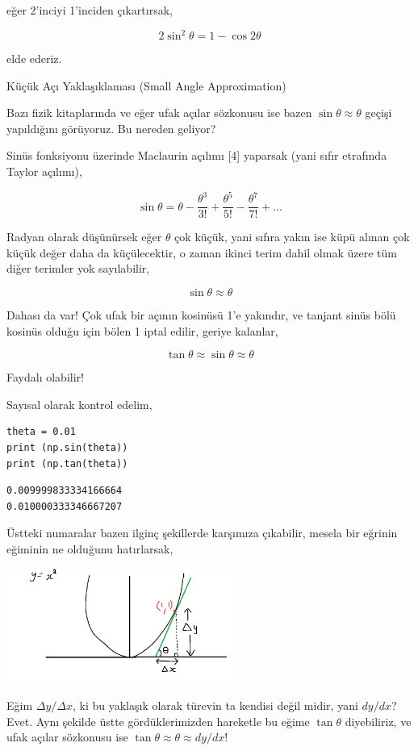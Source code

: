 \documentclass[12pt,fleqn]{article}\usepackage{../../common}
\begin{document}
eğer 2'inciyi 1'inciden çıkartırsak,

$$
2\sin^2\theta = 1 - \cos2\theta
$$

elde ederiz.

Küçük Açı Yaklaşıklaması (Small Angle Approximation)

Bazı fizik kitaplarında ve eğer ufak açılar sözkonusu ise bazen $\sin\theta
\approx \theta$ geçişi yapıldığını görüyoruz. Bu nereden geliyor?

Sinüs fonksiyonu üzerinde Maclaurin açılımı [4] yaparsak (yani sıfır etrafında
Taylor açılımı),

$$
\sin\theta =
\theta -
\frac{\theta^3}{3!} +
\frac{\theta^5}{5!} -
\frac{\theta^7}{7!} + ...
$$

Radyan olarak düşünürsek eğer $\theta$ çok küçük, yani sıfıra yakın ise küpü
alınan çok küçük değer daha da küçülecektir, o zaman ikinci terim dahil olmak
üzere tüm diğer terimler yok sayılabilir,

$$
\sin\theta \approx \theta
$$

Dahası da var! Çok ufak bir açının kosinüsü 1'e yakındır, ve tanjant sinüs bölü
kosinüs olduğu için bölen 1 iptal edilir, geriye kalanlar,

$$
\tan\theta \approx \sin\theta \approx \theta
$$

Faydalı olabilir!

Sayısal olarak kontrol edelim,

\begin{verbatim}
theta = 0.01
print (np.sin(theta))
print (np.tan(theta))
\end{verbatim}

\begin{verbatim}
0.009999833334166664
0.010000333346667207
\end{verbatim}

Üstteki numaralar bazen ilginç şekillerde karşımıza çıkabilir, mesela bir
eğrinin eğiminin ne olduğunu hatırlarsak,

\includegraphics[width=20em]{slope_tan2.png}

Eğim $\Delta y / \Delta x$, ki bu yaklaşık olarak türevin ta kendisi değil
midir, yani $dy / dx$? Evet. Aynı şekilde üstte gördüklerimizden hareketle
bu eğime $\tan\theta$ diyebiliriz, ve ufak açılar sözkonusu ise
$\tan\theta \approx \theta \approx dy / dx$!
\end{document}
